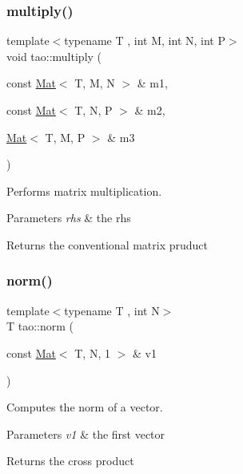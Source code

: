 \subsubsection{\texorpdfstring{multiply()}{multiply()}}
{\footnotesize\ttfamily template$<$typename T , int M, int N, int P$>$ \\
void tao\+::multiply (\begin{DoxyParamCaption}\item[{const \mbox{\hyperlink{classtao_1_1_mat}{Mat}}$<$ T, M, N $>$ \&}]{m1,  }\item[{const \mbox{\hyperlink{classtao_1_1_mat}{Mat}}$<$ T, N, P $>$ \&}]{m2,  }\item[{\mbox{\hyperlink{classtao_1_1_mat}{Mat}}$<$ T, M, P $>$ \&}]{m3 }\end{DoxyParamCaption})}



Performs matrix multiplication. 


\begin{DoxyParams}{Parameters}
{\em rhs} & the rhs \\
\hline
\end{DoxyParams}
\begin{DoxyReturn}{Returns}
the conventional matrix pruduct 
\end{DoxyReturn}
\mbox{\label{namespacetao_ac35e732bcf5d8bfb7df27de9fc96ba08}} 
\subsubsection{\texorpdfstring{norm()}{norm()}}
{\footnotesize\ttfamily template$<$typename T , int N$>$ \\
T tao\+::norm (\begin{DoxyParamCaption}\item[{const \mbox{\hyperlink{classtao_1_1_mat}{Mat}}$<$ T, N, 1 $>$ \&}]{v1 }\end{DoxyParamCaption})}



Computes the norm of a vector. 


\begin{DoxyParams}{Parameters}
{\em v1} & the first vector \\
\hline
\end{DoxyParams}
\begin{DoxyReturn}{Returns}
the cross product 
\end{DoxyReturn}
\mbox{\label{namespacetao_a8ed9b8556b4fa9f623903552fe9240de}} 

